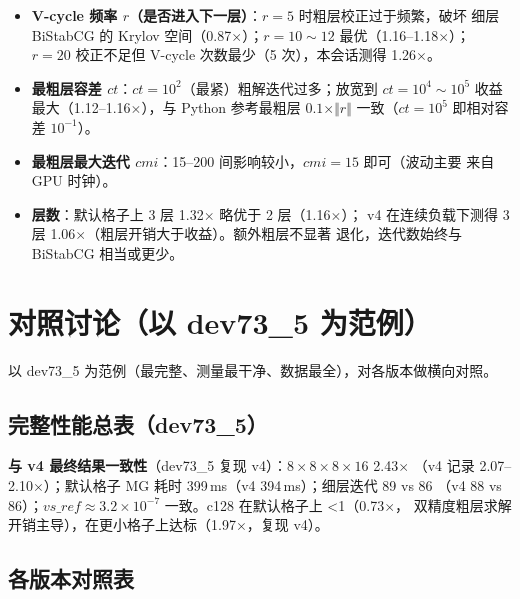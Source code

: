 \documentclass[11pt,a4paper]{article}
\begin{document}
\begin{itemize}
  \item \textbf{V-cycle 频率 $r$（是否进入下一层）}：$r=5$ 时粗层校正过于频繁，破坏
        细层 BiStabCG 的 Krylov 空间（0.87$\times$）；$r=10\sim12$ 最优（1.16--1.18$\times$）；
        $r=20$ 校正不足但 V-cycle 次数最少（5 次），本会话测得 1.26$\times$。
  \item \textbf{最粗层容差 $ct$}：$ct=10^2$（最紧）粗解迭代过多；放宽到
        $ct=10^4\sim10^5$ 收益最大（1.12--1.16$\times$），与 Python 参考最粗层
        $0.1\times\Vert r\Vert$ 一致（$ct=10^5$ 即相对容差 $10^{-1}$）。
  \item \textbf{最粗层最大迭代 $cmi$}：15--200 间影响较小，$cmi=15$ 即可（波动主要
        来自 GPU 时钟）。
  \item \textbf{层数}：默认格子上 3 层 1.32$\times$ 略优于 2 层（1.16$\times$）；
        v4 在连续负载下测得 3 层 1.06$\times$（粗层开销大于收益）。额外粗层不显著
        退化，迭代数始终与 BiStabCG 相当或更少。
\end{itemize}

\section{对照讨论（以 dev73\_5 为范例）}
\label{sec:comparison}

以 dev73\_5 为范例（最完整、测量最干净、数据最全），对各版本做横向对照。

\subsection{完整性能总表（dev73\_5）}
\label{sec:dev735}



\textbf{与 v4 最终结果一致性}（dev73\_5 复现 v4）：$8\times8\times8\times16$ 2.43$\times$
（v4 记录 2.07--2.10$\times$）；默认格子 MG 耗时 399\,ms（v4 394\,ms）；细层迭代 89 vs 86
（v4 88 vs 86）；$vs\_ref\approx3.2\times10^{-7}$ 一致。c128 在默认格子上 <1（0.73$\times$，
双精度粗层求解开销主导），在更小格子上达标（1.97$\times$，复现 v4）。

\subsection{各版本对照表}
\label{sec:cross}
\end{document}
